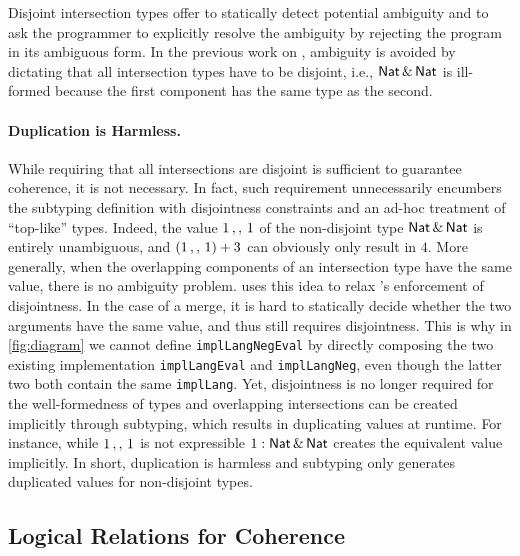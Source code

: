 Disjoint intersection types offer to statically detect potential ambiguity and
to ask the programmer to explicitly resolve the ambiguity by rejecting the
program in its ambiguous form. In the previous work on \oname, ambiguity is
avoided by dictating that all intersection types have to be disjoint, i.e.,
$\mathsf{Nat} \,\&\, \mathsf{Nat}$ is ill-formed because the first component
has the same type as the second.

\paragraph{Duplication is Harmless.}
While requiring that all intersections are disjoint is sufficient to guarantee
coherence, it is not necessary. In fact,
such requirement unnecessarily encumbers the subtyping definition with disjointness constraints
and an ad-hoc treatment of ``top-like'' types. Indeed, the value $1 \, ,, \, 1$
of the non-disjoint type $\mathsf{Nat} \,\&\, \mathsf{Nat}$ is entirely unambiguous, and
$(1 \, ,, \, 1) + 3$ can obviously only result in $4$. More generally, when the
overlapping components of an intersection type have the same value, there is no
ambiguity problem. \namee uses this idea to relax \oname's enforcement of
disjointness. In the case of a merge, it is hard to statically decide whether
the two arguments have the same value, and thus \namee still requires
disjointness. This is why in \cref{fig:diagram} we cannot define
\lstinline{implLangNegEval} by directly composing the two existing implementation
\lstinline{implLangEval} and \lstinline{implLangNeg}, even though the latter two
both contain the same \lstinline{implLang}.
Yet, disjointness is no longer required for the well-formedness
of types and overlapping intersections can be created implicitly through
subtyping, which results in duplicating values at runtime. For instance, while
$1 \, ,, \, 1$ is not expressible
$ 1 : \mathsf{Nat} \,\&\, \mathsf{Nat}$ creates the equivalent value implicitly.
In short, duplication is harmless and subtyping only generates duplicated
values for non-disjoint types.


\subsection{Logical Relations for Coherence}

